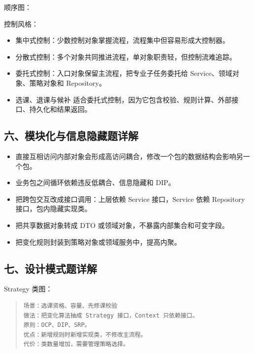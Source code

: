 \documentclass[UTF8,zihao=-4]{ctexart}
\begin{document}
顺序图：





控制风格：


\begin{itemize}
\item 集中式控制：少数控制对象掌握流程，流程集中但容易形成大控制器。
\item 分散式控制：多个对象共同推进流程，单对象职责轻，但控制流难追踪。
\item 委托式控制：入口对象保留主流程，把专业子任务委托给 Service、领域对象、策略对象和 Repository。
\item 选课、退课与候补 适合委托式控制，因为它包含校验、规则计算、外部接口、持久化和结果返回。
\end{itemize}



\subsection{六、模块化与信息隐藏题详解}


\begin{itemize}
\item 直接互相访问内部对象会形成高访问耦合，修改一个包的数据结构会影响另一个包。
\item 业务包之间循环依赖违反低耦合、信息隐藏和 DIP。
\item 把跨包交互改成接口调用：上层依赖 Service 接口，Service 依赖 Repository 接口，包内隐藏实现类。
\item 把共享数据对象转成 DTO 或领域对象，不暴露内部集合和可变字段。
\item 把变化规则封装到策略对象或领域服务中，提高内聚。
\end{itemize}



\subsection{七、设计模式题详解}


Strategy 类图：


\begin{quote}
\footnotesize
\begin{verbatim}
场景：选课资格、容量、先修课校验
做法：把变化算法抽成 Strategy 接口，Context 只依赖接口。
原则：OCP、DIP、SRP。
优点：新增规则时新增实现类，不修改主流程。
代价：类数量增加，需要管理策略选择。
\end{verbatim}
\end{quote}
\end{document}
